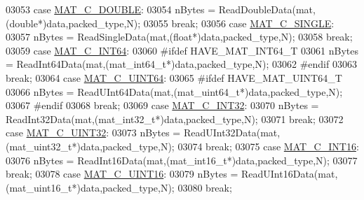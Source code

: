 \begin{DoxyCode}
{{{{{{{{{{{{{{{{03053             \textcolor{keywordflow}{case} \hyperlink{group___m_a_t_ggad4d60ae7b709fc81bfd744fb4c857c40a5d70e0862e5bdb7bd86bf7ba5948f307}{MAT\_C\_DOUBLE}:
03054                 nBytes = ReadDoubleData(mat,(\textcolor{keywordtype}{double}*)data,packed\_type,N);
03055                 \textcolor{keywordflow}{break};
03056             \textcolor{keywordflow}{case} \hyperlink{group___m_a_t_ggad4d60ae7b709fc81bfd744fb4c857c40a2825631e26a961cbe0f79db50a39cea2}{MAT\_C\_SINGLE}:
03057                 nBytes = ReadSingleData(mat,(\textcolor{keywordtype}{float}*)data,packed\_type,N);
03058                 \textcolor{keywordflow}{break};
03059             \textcolor{keywordflow}{case} \hyperlink{group___m_a_t_ggad4d60ae7b709fc81bfd744fb4c857c40a1ea83bcde49b35477494412973f82409}{MAT\_C\_INT64}:
03060 \textcolor{preprocessor}{#ifdef HAVE\_MAT\_INT64\_T}
03061                 nBytes = ReadInt64Data(mat,(mat\_int64\_t*)data,packed\_type,N);
03062 \textcolor{preprocessor}{#endif}
03063                 \textcolor{keywordflow}{break};
03064             \textcolor{keywordflow}{case} \hyperlink{group___m_a_t_ggad4d60ae7b709fc81bfd744fb4c857c40a86470e25c3763d9a24623f04326195dd}{MAT\_C\_UINT64}:
03065 \textcolor{preprocessor}{#ifdef HAVE\_MAT\_UINT64\_T}
03066                 nBytes = ReadUInt64Data(mat,(mat\_uint64\_t*)data,packed\_type,N);
03067 \textcolor{preprocessor}{#endif}
03068                 \textcolor{keywordflow}{break};
03069             \textcolor{keywordflow}{case} \hyperlink{group___m_a_t_ggad4d60ae7b709fc81bfd744fb4c857c40adb44fc39694e3152ae5e69470a2fefe8}{MAT\_C\_INT32}:
03070                 nBytes = ReadInt32Data(mat,(mat\_int32\_t*)data,packed\_type,N);
03071                 \textcolor{keywordflow}{break};
03072             \textcolor{keywordflow}{case} \hyperlink{group___m_a_t_ggad4d60ae7b709fc81bfd744fb4c857c40a9a17a7edd45b19ef68197db81b27e816}{MAT\_C\_UINT32}:
03073                 nBytes = ReadUInt32Data(mat,(mat\_uint32\_t*)data,packed\_type,N);
03074                 \textcolor{keywordflow}{break};
03075             \textcolor{keywordflow}{case} \hyperlink{group___m_a_t_ggad4d60ae7b709fc81bfd744fb4c857c40a40370e9de516c5036a67a5865c071006}{MAT\_C\_INT16}:
03076                 nBytes = ReadInt16Data(mat,(mat\_int16\_t*)data,packed\_type,N);
03077                 \textcolor{keywordflow}{break};
03078             \textcolor{keywordflow}{case} \hyperlink{group___m_a_t_ggad4d60ae7b709fc81bfd744fb4c857c40a8bede21dbf6c1edc0bbccc1481bccae7}{MAT\_C\_UINT16}:
03079                 nBytes = ReadUInt16Data(mat,(mat\_uint16\_t*)data,packed\_type,N);
03080                 \textcolor{keywordflow}{break};
}}}}}}}}}}}}}}}}
\end{DoxyCode}
